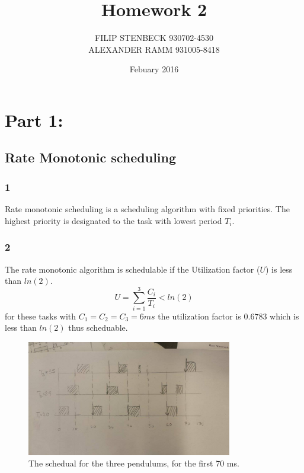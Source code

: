 \documentclass[10pt,a4paper]{article}
\author{FILIP STENBECK	930702-4530 \\ ALEXANDER RAMM 931005-8418}
\date{Febuary 2016}
\title{Homework 2}
\begin{document}
\maketitle
\clearpage
\section*{Part 1:}
\subsection*{Rate Monotonic scheduling}
\subsubsection*{1}
Rate monotonic scheduling is a scheduling algorithm with fixed priorities. The highest priority is designated to the task with lowest period $T_i$. 
\subsubsection*{2}
The rate monotonic algorithm is schedulable if the Utilization factor ($U$) is less than $ln(2)$.
\begin{equation*}
U=\sum_{
   i=1
  }^{3}
 \frac{C_i}{T_i}<ln(2)
\end{equation*}
for these tasks with $C_1=C_2=C_3=6 ms$ the utilization factor is $0.6783$ which is less than $ln(2)$ thus scheduable.
\begin{figure}[!h]
  \centering
    \includegraphics[width=0.8\textwidth]{egen.jpg}
      \caption{The schedual for the three pendulums, for the first 70 ms.}
\end{figure}
\end{document}
